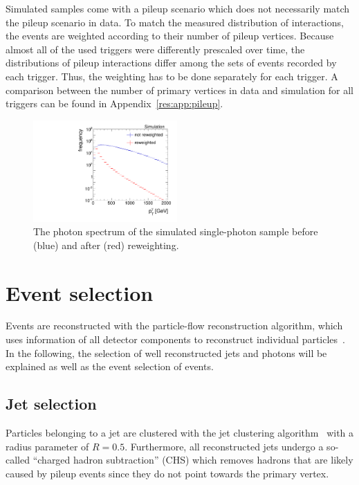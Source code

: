 Simulated samples come with a pileup scenario which does not necessarily match the pileup scenario in data. 
To match the measured distribution of interactions, the events are weighted according to their number of pileup vertices. 
Because almost all of the used triggers were differently prescaled over time, the distributions of pileup interactions differ among the sets of events recorded by each trigger.
Thus, the weighting has to be done separately for each trigger.
A comparison between the number of primary vertices in data and simulation for all triggers can be found in Appendix~\ref{res:app:pileup}.
\begin{figure}[ht]
  \centering
      \includegraphics[width=0.49\textwidth]{figures/resolution/eventSelection/PhotonPtComparison_reweighted.pdf} 
  \caption{The photon \pt spectrum of the \pythiaSix simulated single-photon sample before (blue) and after (red) reweighting.}  
  \label{res:fig:PhotonPtSpectrum}
\end{figure}


\section{Event selection}
\label{res:sec:EventSelection}
Events are reconstructed with the particle-flow reconstruction algorithm, which uses information of all detector components to reconstruct individual particles~\cite{CMS-PAS-PFT-09-001}.
In the following, the selection of well reconstructed jets and photons will be explained as well as the event selection of \GAMJET events.

\subsection*{Jet selection}
Particles belonging to a jet are clustered with the \antikt jet clustering algorithm~\cite{bib:JetClustering_2008} with a radius parameter of $R=0.5$.
Furthermore, all reconstructed jets undergo a so-called ``charged hadron subtraction'' (CHS) which removes hadrons that are likely caused by pileup events since they do not point towards the primary vertex.

